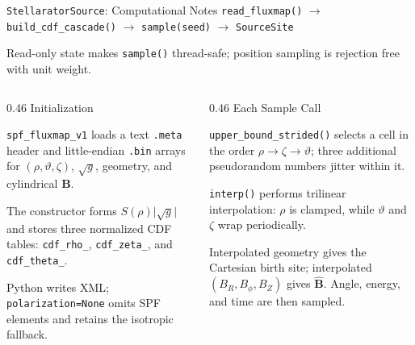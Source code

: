 \documentclass[aspectratio=169,10pt]{beamer}
\newcommand{\Bhat}{\widehat{\mathbf{B}}}
\newcommand{\slideline}{\par\vspace{0.12cm}{\color{jqdark}\rule{\linewidth}{0.65pt}}\par}
\begin{document}
\begin{frame}{\texttt{StellaratorSource}: Computational Notes}
  \centering
  {\fontsize{8.8}{10.6}\selectfont
  \texttt{read\_fluxmap()} $\longrightarrow$ \texttt{build\_cdf\_cascade()} $\longrightarrow$ \texttt{sample(seed)} $\longrightarrow$ \texttt{SourceSite}}

  \vspace{0.02cm}
  {\fontsize{8.4}{10.0}\selectfont Read-only state makes \texttt{sample()} thread-safe; position sampling is rejection free with unit weight.}

  \vspace{0.05cm}
  \begin{columns}[T,onlytextwidth]
    \begin{column}{0.46\textwidth}
      Initialization
      \slideline
      {\fontsize{8.6}{10.3}\selectfont
      \texttt{spf\_fluxmap\_v1} loads a text \texttt{.meta} header and little-endian \texttt{.bin} arrays for $(\rho,\vartheta,\zeta)$, $\sqrt g$, geometry, and cylindrical $\mathbf B$.

      \vspace{0.10cm}
      The constructor forms $S(\rho)\lvert\sqrt g\rvert$ and stores three normalized CDF tables: \texttt{cdf\_rho\_}, \texttt{cdf\_zeta\_}, and \texttt{cdf\_theta\_}.

      \vspace{0.10cm}
      Python writes XML; \texttt{polarization=None} omits SPF elements and retains the isotropic fallback.
      }
    \end{column}
    \begin{column}{0.46\textwidth}
      Each Sample Call
      \slideline
      {\fontsize{8.6}{10.3}\selectfont
      \texttt{upper\_bound\_strided()} selects a cell in the order $\rho\rightarrow\zeta\rightarrow\vartheta$; three additional pseudorandom numbers jitter within it.

      \vspace{0.10cm}
      \texttt{interp()} performs trilinear interpolation: $\rho$ is clamped, while $\vartheta$ and $\zeta$ wrap periodically.

      \vspace{0.10cm}
      Interpolated geometry gives the Cartesian birth site; interpolated $(B_R,B_\phi,B_Z)$ gives $\Bhat$. Angle, energy, and time are then sampled.
      }
    \end{column}
  \end{columns}


\end{frame}
\end{document}
